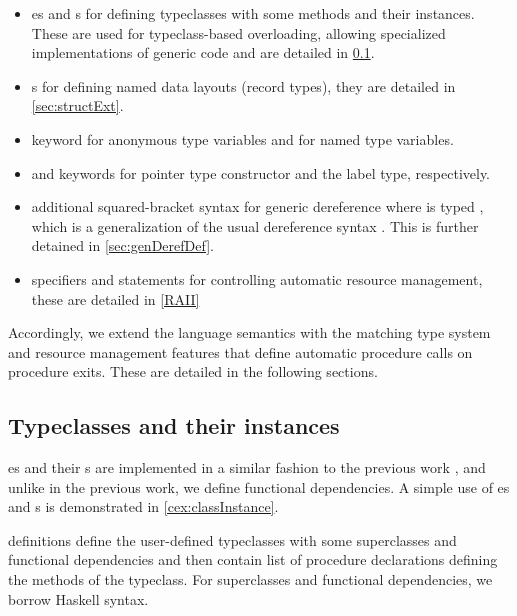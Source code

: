 \begin{itemize}
    \item {}es and s for defining typeclasses with some methods and their instances. These are used for typeclass-based overloading, allowing specialized implementations of generic code and are detailed in \cref{sec:tyClassInst}.

    \item {}s for defining named data layouts (record types), they are detailed in \cref{sec:structExt}.

    \item {} keyword for anonymous type variables and  for named type variables.

    \item {} and  keywords for pointer type constructor and the label type, respectively.

    \item additional squared-bracket syntax for generic dereference \li{[address]} where  is typed , which is a generalization of the usual \cmm dereference syntax . This is further detained in \cref{sec:genDerefDef}.

    \item {} specifiers and  statements for controlling automatic resource management, these are detailed in \cref{RAII}
\end{itemize}

Accordingly, we extend the language semantics with the matching type system and resource management features that define automatic procedure calls on procedure exits. These are detailed in the following sections.

\subsection{Typeclasses and their instances}
\label{sec:tyClassInst}

es and their s are implemented in a similar fashion to the previous work \cite{klepl2020type}, and unlike in the previous work, we define functional dependencies. A simple use of es and s is demonstrated in \cref{cex:classInstance}.

 definitions define the user-defined typeclasses with some superclasses and functional dependencies and then contain list of procedure declarations defining the methods of the typeclass. For superclasses and functional dependencies, we borrow Haskell syntax.


